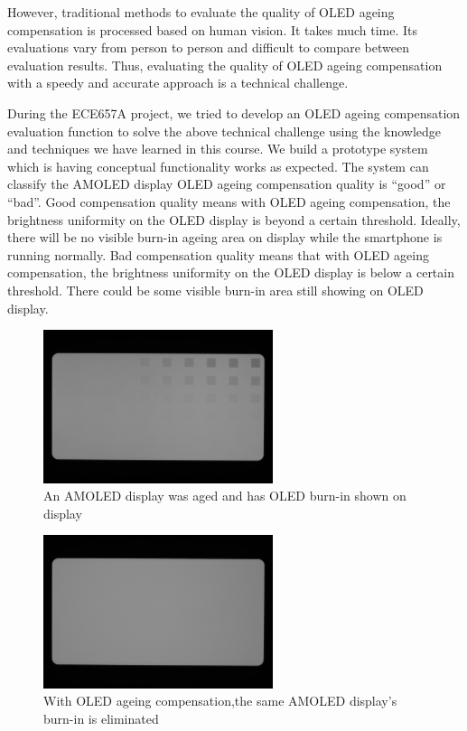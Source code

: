 \documentclass[runningheads]{llncs}
\begin{document}
However, traditional methods to evaluate the quality of OLED ageing compensation is processed based on human vision. It takes much time. Its evaluations vary from person to person and difficult to compare between evaluation results. Thus, evaluating the quality of OLED ageing compensation with a speedy and accurate approach is a technical challenge.

During the ECE657A project, we tried to develop an OLED ageing compensation evaluation function to solve the above technical challenge using the knowledge and techniques we have learned in this course. We build a prototype system which is having conceptual functionality works as expected. The system can classify the AMOLED display OLED ageing compensation quality is “good” or “bad”. Good compensation quality means with OLED ageing compensation, the brightness uniformity on the OLED display is beyond a certain threshold. Ideally, there will be no visible burn-in ageing area on display while the smartphone is running normally. Bad compensation quality means that with OLED ageing compensation, the brightness uniformity on the OLED display is below a certain threshold. There could be some visible burn-in area still showing on OLED display.

\begin{figure}
    \centering
    \includegraphics[width=0.6\textwidth]{uncomp.jpeg}
    \caption{An AMOLED display was aged and has OLED burn-in shown on display}
    \label{fig:1}
\end{figure}
\begin{figure}
    \centering
    \includegraphics[width=0.6\textwidth]{comp.jpeg}
    \caption{With OLED ageing compensation,the same AMOLED display's burn-in is eliminated}
    \label{fig:2}
\end{figure}
%
%
\end{document}
